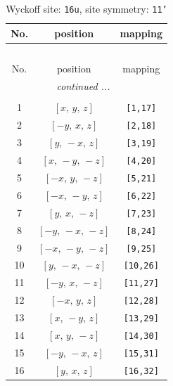 \documentclass[fleqn,8pt]{jsarticle}
\begin{document}
\begin{longtable}{ccc}
\caption{Wyckoff site: {\tt 16u}, site symmetry: {\tt 11'}}
 \\
 \hline \hline
No. & position & mapping \\ \hline \endfirsthead

\multicolumn{2}{l}{\tablename\ \thetable{}} \\
 \hline \hline
No. & position & mapping \\ \hline \endhead

 \hline \hline
\multicolumn{2}{r}{\footnotesize\it continued ...} \\ \endfoot

 \hline \hline
\multicolumn{2}{r}{} \\ \endlastfoot

1 & $\left[ x,\, y,\, z \right]$ & {\tt [1,17]} \\ \hline
2 & $\left[ - y,\, x,\, z \right]$ & {\tt [2,18]} \\ \hline
3 & $\left[ y,\, - x,\, z \right]$ & {\tt [3,19]} \\ \hline
4 & $\left[ x,\, - y,\, - z \right]$ & {\tt [4,20]} \\ \hline
5 & $\left[ - x,\, y,\, - z \right]$ & {\tt [5,21]} \\ \hline
6 & $\left[ - x,\, - y,\, z \right]$ & {\tt [6,22]} \\ \hline
7 & $\left[ y,\, x,\, - z \right]$ & {\tt [7,23]} \\ \hline
8 & $\left[ - y,\, - x,\, - z \right]$ & {\tt [8,24]} \\ \hline
9 & $\left[ - x,\, - y,\, - z \right]$ & {\tt [9,25]} \\ \hline
10 & $\left[ y,\, - x,\, - z \right]$ & {\tt [10,26]} \\ \hline
11 & $\left[ - y,\, x,\, - z \right]$ & {\tt [11,27]} \\ \hline
12 & $\left[ - x,\, y,\, z \right]$ & {\tt [12,28]} \\ \hline
13 & $\left[ x,\, - y,\, z \right]$ & {\tt [13,29]} \\ \hline
14 & $\left[ x,\, y,\, - z \right]$ & {\tt [14,30]} \\ \hline
15 & $\left[ - y,\, - x,\, z \right]$ & {\tt [15,31]} \\ \hline
16 & $\left[ y,\, x,\, z \right]$ & {\tt [16,32]} \\
\end{longtable}
\end{document}
